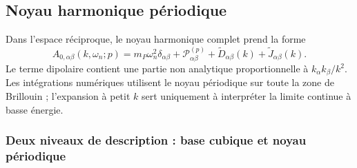 \subsection{Noyau harmonique périodique}

Dans l'espace réciproque, le noyau harmonique complet prend la forme
\begin{equation}
A_{0,\alpha\beta}(k,\omega_n;p)
=m_P\omega_n^2\delta_{\alpha\beta}
+\mathcal P^{(p)}_{\alpha\beta}
+\widetilde D_{\alpha\beta}(k)
+\widetilde J_{\alpha\beta}(k).
\label{eq:ann_noyau_harmonique}
\end{equation}
Le terme dipolaire contient une partie non analytique proportionnelle à
$k_\alpha k_\beta/k^2$. Les intégrations numériques utilisent le noyau
périodique sur toute la zone de Brillouin ; l'expansion à petit
$k$ sert uniquement à interpréter la limite continue à basse énergie.

\subsubsection{Deux niveaux de description : base cubique et noyau périodique}
\label{sec:core_periodic_kernel_descriptions}

